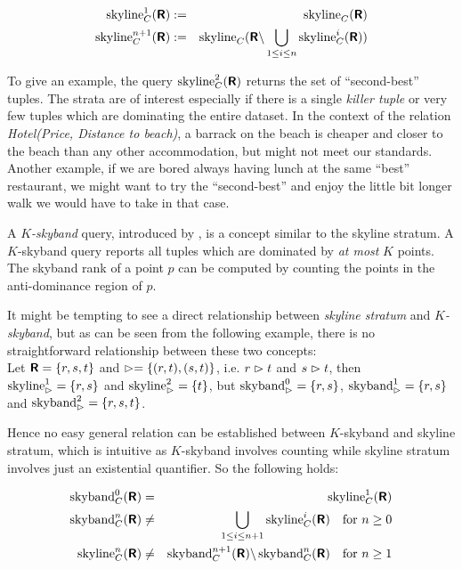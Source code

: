 \begin{eqnarray}
\skyline_C^1(\relation{R}) & := & \skyline_C(\relation{R}) \\
\skyline_C^{n+1}(\relation{R}) & := & \skyline_C(\relation{R} \difference \bigunion_{1 \le i \le n} \skyline_C^i(\relation{R}))
\end{eqnarray}

To give an example, the query $\skyline_C^2(\relation{R})$ returns
the set of ``second-best'' tuples.
%
The strata are of interest especially if there is a single
\emph{killer tuple} or very few tuples which are dominating the entire
dataset.  In the context of the relation \emph{Hotel(Price, Distance
to beach)}, a barrack on the beach is cheaper and closer to the beach
than any other accommodation, but might not meet our
standards.  Another example, if we are bored always having lunch at the
same ``best'' restaurant, we might want to try the ``second-best'' and
enjoy the little bit longer walk we would have to take in that case.

A \emph{$K$-skyband} query, introduced by
\citet{Papadias2005}, is a concept similar to the skyline stratum. A
$K$-skyband query reports all tuples which are dominated by \emph{at most}
$K$ points.  
The skyband rank of a point $p$ can be computed by counting the points
in the anti-dominance region of $p$.

It might be tempting to see a direct relationship between
\emph{skyline stratum} and \emph{$K$-skyband}, but as can be seen from
the following example, there is no straightforward relationship between these two
concepts: \\
Let $\textnormal{\bf\textsf{R}} = \{r, s, t\}$ and $\vartriangleright =\{(r,t), (s,t)\}$, 
i.e. $r \vartriangleright t$ and $s \vartriangleright t$, 
then $\skyline_\dominates^1 = \{r, s\}$ and $\skyline_\dominates^2 = \{t\}$, 
but $\skyband_\dominates^0 = \{r, s\}$, $\skyband_\dominates^1 = \{r, s\}$ and
$\skyband_\dominates^2 = \{r, s, t\}$.

\noindent
Hence no easy general relation can be established between $K$-skyband
and skyline stratum, which is intuitive as $K$-skyband involves counting
while skyline stratum involves just an existential quantifier.
So the following holds:


\begin{eqnarray}
\skyband_C^0(\relation{R}) &=& \skyline_C^1(\relation{R}) \label{equ:skyband} \\
\skyband_C^n(\relation{R}) &\not=& \bigunion_{1 \le i \le n+1} \skyline_C^i(\relation{R}) \quad \textnormal{for}\ n \ge 0\label{equ:skybandgeneral} \\
\skyline_C^n(\relation{R}) &\not=& \skyband_C^{n+1}(\relation{R}) \difference \skyband_C^n(\relation{R}) \quad \textnormal{for}\ n \ge 1
\end{eqnarray}

